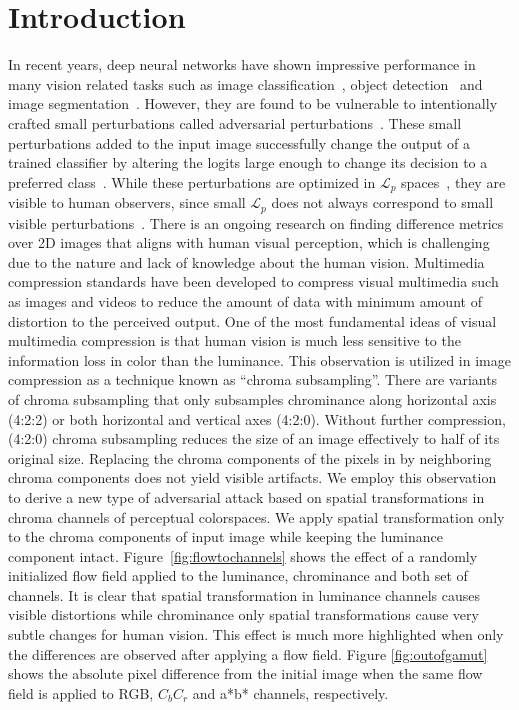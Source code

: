 \chapter{Introduction}
\label{chp:b1}

In recent years, deep neural networks have shown impressive performance in many vision related tasks such as image classification~\cite{he2015deep}, object detection~\cite{redmon2018yolov3} and image segmentation~\cite{long2015fully}. However, they are found to be vulnerable to intentionally crafted small perturbations called adversarial perturbations~\cite{szegedy2013intriguing}. These small perturbations added to the input image successfully change the output of a trained classifier by altering the logits large enough to change its decision to a preferred class~\cite{goodfellow2014explaining}. While these perturbations are optimized in \(\mathcal{L}_p\) spaces~\cite{carlini2017towards}, they are visible to human observers, since small \(\mathcal{L}_p\) does not always correspond to small visible perturbations~\cite{jordan2019quantifying,engstrom2018rotation}.
There is an ongoing research on finding difference metrics over 2D images that aligns with human visual perception, which is challenging due to the nature and lack of knowledge about the human vision. Multimedia compression standards have been developed to compress visual multimedia such as images and videos to reduce the amount of data with minimum amount of distortion to the perceived output. One of the most fundamental ideas of visual multimedia compression is that human vision is much less sensitive to the information loss in color than the luminance.
This observation is utilized in image compression as a technique known as ``chroma subsampling''. There are variants of chroma subsampling that only subsamples chrominance along horizontal axis (4:2:2) or both horizontal and vertical axes (4:2:0). Without further compression, (4:2:0) chroma subsampling reduces the size of an image effectively to half of its original size. Replacing the chroma components of the pixels in by neighboring chroma components does not yield visible artifacts. We employ this observation to derive a new type of adversarial attack based on spatial transformations in chroma channels of perceptual colorspaces. We apply spatial transformation only to the chroma components of input image while keeping the luminance component intact. Figure~\ref{fig:flowtochannels} shows the effect of a randomly initialized flow field applied to the luminance, chrominance and both set of channels. It is clear that spatial transformation in luminance channels causes visible distortions while chrominance only spatial transformations cause very subtle changes for human vision. This effect is much more highlighted when only the differences are observed after applying a flow field. Figure \ref{fig:outofgamut} shows the absolute pixel difference from the initial image when the same flow field is applied to RGB, \(C_{b}C_{r}\) and a*b* channels, respectively.
